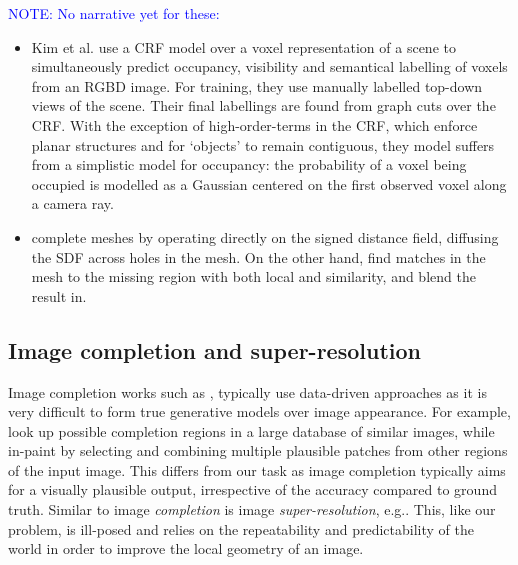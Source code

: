 \documentclass[10pt,twocolumn,letterpaper]{article}
\makeatletter
\renewcommand*{\eg}{e.g.\@\xspace}
\newcommand*{\ea}{et al.\@\xspace}
\newcommand{\note}[1]{\textcolor{blue}{NOTE: #1}}
\makeatother
\begin{document}
\note{No narrative yet for these:}
\begin{itemize}

\item Kim \ea \cite{kim-iccv-2013} use a CRF model over a voxel representation of a scene to simultaneously predict occupancy, visibility and semantical labelling of voxels from an RGBD image. 
For training, they use manually labelled top-down views of the scene.
Their final labellings are found from graph cuts over the CRF.
With the exception of high-order-terms in the CRF, which enforce planar structures and for `objects' to remain contiguous, they model suffers from a simplistic model for occupancy: the probability of a voxel being occupied is modelled as a Gaussian centered on the first observed voxel along a camera ray.

\item \cite{davis-3dpvt-2002} complete meshes by operating directly on the signed distance field, diffusing the SDF across holes in the mesh. 
On the other hand, \cite{harary-tog-2013} find matches in the mesh to the missing region with both local and similarity, and blend the result in.

\end{itemize}

\subsection{Image completion and super-resolution}
Image completion works such as \cite{hays-siggraph-2007, criminisi-cvpr-2003}, 
typically use data-driven approaches as it is very difficult to form true generative models over image appearance.
For example, \cite{hays-siggraph-2007} look up possible completion regions in a large database of similar images, while \cite{criminisi-cvpr-2003} in-paint by selecting and combining multiple plausible patches from other regions of the input image.
This differs from our task as image completion typically aims for a visually plausible output, irrespective of the accuracy compared to ground truth.
Similar to image \emph{completion} is image \emph{super-resolution}, \eg \cite{macaodha-eccv-2012, dong-eccv-2014}. 
This, like our problem, is ill-posed and relies on the repeatability and predictability of the world in order to improve the local geometry of an image.
\end{document}
